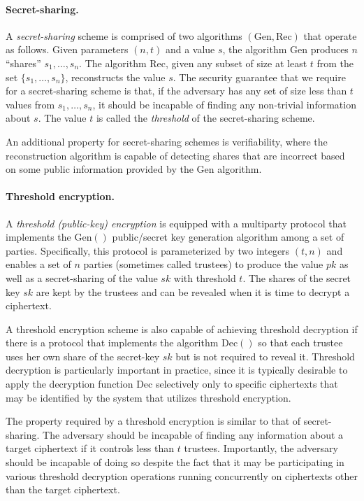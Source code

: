 \paragraph{Secret-sharing.} A \emph{secret-sharing} scheme is
comprised of two algorithms $(\mathrm{Gen}, \mathrm{Rec})$ that
operate as follows. Given parameters $(n,t)$ and a value $s$, the
algorithm $\mathrm{Gen}$ produces $n$ ``shares'' $s_1, \ldots, s_n$.
The algorithm $\mathrm{Rec}$, given any subset of size at least $t$
from the set $\{s_1, \ldots, s_n\}$, reconstructs the value $s$. The
security guarantee that we require for a secret-sharing scheme is
that, if the adversary has any set of size less than $t$ values from
$s_1,\ldots, s_n$, it should be incapable of finding any non-trivial
information about $s$. The value $t$ is called the \emph{threshold} of
the secret-sharing scheme.

An additional property for secret-sharing schemes is verifiability,
where the reconstruction algorithm is capable of detecting shares that
are incorrect based on some public information provided by the
$\mathrm{Gen}$ algorithm.

\paragraph{Threshold encryption.} A \emph{threshold (public-key)
  encryption} is equipped with a multiparty protocol that implements
the $\mathrm{Gen}()$ public/secret key generation algorithm among a
set of parties. Specifically, this protocol is parameterized by two
integers $(t,n)$ and enables a set of $n$ parties (sometimes called
trustees) to produce the value $pk$ as well as a secret-sharing of the
value $sk$ with threshold $t$. The shares of the secret key $sk$ are
kept by the trustees and can be revealed when it is time to decrypt a
ciphertext.

A threshold encryption scheme is also capable of achieving threshold
decryption if there is a protocol that implements the algorithm
$\mathrm{Dec}()$ so that each trustee uses her own share of the
secret-key $sk$ but is not required to reveal it. Threshold decryption
is particularly important in practice, since it is typically desirable
to apply the decryption function $\mathrm{Dec}$ selectively only to
specific ciphertexts that may be identified by the system that
utilizes threshold encryption.

The property required by a threshold encryption is similar to that of
secret-sharing. The adversary should be incapable of finding any
information about a target ciphertext if it controls less than $t$
trustees. Importantly, the adversary should be incapable of doing so
despite the fact that it may be participating in various threshold
decryption operations running concurrently on ciphertexts other than
the target ciphertext.


